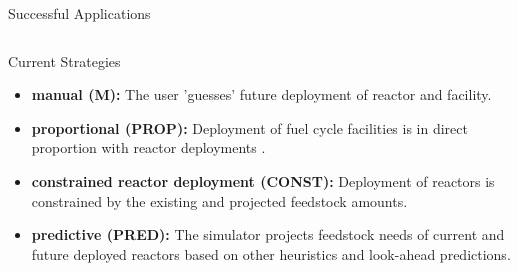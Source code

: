 \documentclass[final]{beamer}
\newlength{\onecolwid}
\newlength{\twocolwid}
\begin{document}
\begin{frame}[t]
\begin{columns}[t]
\begin{column}{\twocolwid}
\begin{columns}[t,totalwidth=\twocolwid]
\begin{column}{\onecolwid}
\begin{block}{Successful Applications}
\end{block}


\end{column} %

\end{columns} %



\begin{columns}[t,totalwidth=\twocolwid] %

\begin{column}{\onecolwid} %


\begin{block}{Current Strategies}
	
	\begin{itemize}
		\item \textbf{manual (M):} The user 'guesses' future deployment of reactor and facility.
		\item \textbf{proportional (PROP):} Deployment of fuel cycle facilities is in 
		direct proportion with reactor deployments .
		\item \textbf{constrained reactor deployment (CONST):} Deployment of reactors is 
		constrained by the existing and projected feedstock amounts.
		\item \textbf{predictive (PRED):} The simulator projects feedstock needs of 
		current and future deployed reactors based on other heuristics 
		and look-ahead predictions. 
	\end{itemize}
	

\end{block}
\end{column}
\end{columns}
\end{column}
\end{columns}
\end{frame}
\end{document}
